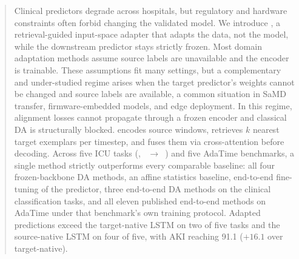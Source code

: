 \begin{abstract}
Clinical predictors degrade across hospitals, but regulatory and hardware constraints often forbid changing the validated model.
We introduce \retr{}, a retrieval-guided input-space adapter that adapts the data, not the model, while the downstream predictor stays strictly frozen.
Most domain adaptation methods assume source labels are unavailable and the encoder is trainable. These assumptions fit many settings, but a complementary and under-studied regime arises when the target predictor's weights cannot be changed and source labels are available, a common situation in SaMD transfer, firmware-embedded models, and edge deployment. In this regime, alignment losses cannot propagate through a frozen encoder and classical DA is structurally blocked.
\retr{} encodes source windows, retrieves $k$ nearest target exemplars per timestep, and fuses them via cross-attention before decoding.
Across five ICU tasks (\eicu{}, \hirid{}~$\to$~\mimic{}) and five AdaTime benchmarks, a single method strictly outperforms every comparable baseline: all four frozen-backbone DA methods, an affine statistics baseline, end-to-end fine-tuning of the predictor, three end-to-end DA methods on the clinical classification tasks, and all eleven published end-to-end methods on AdaTime under that benchmark's own training protocol.
Adapted predictions exceed the target-native LSTM on two of five tasks and the source-native LSTM on four of five, with AKI reaching 91.1 \aucroc{} ($+16.1$ \aucpr{} over target-native).
\end{abstract}
